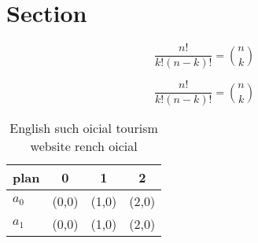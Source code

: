 \documentclass[a4paper]{article}
\begin{document}
\section{Section}

\[ \frac{n!}{k!(n-k)!} = \binom{n}{k} \]

\[ \frac{n!}{k!(n-k)!} = \binom{n}{k} \]

\begin{table}
\begin{adjustbox}{width=0.6\columnwidth}
\begin{tabular}{|l|l|l|l|}
\hline
\textbf{plan} & \multicolumn{1}{c|}{\textbf{0}} & \multicolumn{1}{c|}{\textbf{1}} & \multicolumn{1}{c|}{\textbf{2}} \\ \hline
\textbf{$a_0$}  & (0,0) & (1,0) & (2,0) \\ \hline
\textbf{$a_1$}  & (0,0) & (1,0) & (2,0) \\ \hline
\end{tabular}
\end{adjustbox}
\caption{English such oicial tourism website rench oicial 
}
\end{table}
\end{document}
